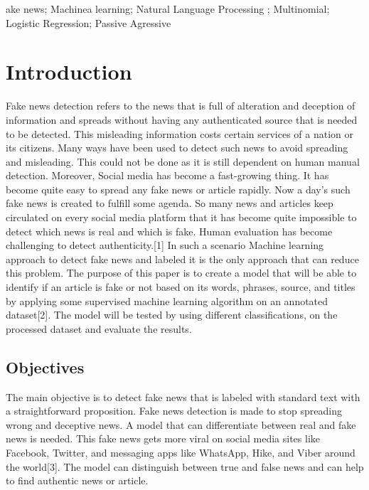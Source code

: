 \documentclass[conference]{IEEEtran}
\begin{document}
\vspace{12pt}


\begin{IEEEkeywords}
ake news; Machinea learning; Natural Language Processing ; Multinomial; Logistic Regression; Passive Agressive
\end{IEEEkeywords}

\section{Introduction}
Fake news detection refers to the news that is full of alteration and deception of information and spreads without having any authenticated source that is needed to be detected. This misleading information costs certain services of a nation or its citizens. Many ways have been used to detect such news to avoid spreading and misleading. This could not be done as it is still dependent on human manual detection. Moreover, Social media has become a fast-growing thing. It has become quite easy to spread any fake news or article rapidly. Now a day’s such fake news is created to fulfill some agenda. So many news and articles keep circulated on every social media platform that it has become quite impossible to detect which news is real and which is fake. Human evaluation has become challenging to detect authenticity.[1] In such a scenario Machine learning approach to detect fake news and labeled it is the only approach that can reduce this problem.
The purpose of this paper is to create a model that will be able to identify if an article is fake or not based on its words, phrases, source, and titles by applying some supervised machine learning algorithm on an annotated dataset[2]. The model will be tested by using different classifications, on the processed dataset and evaluate the results.

\subsection{Objectives}
The main objective is to detect fake news that is labeled with standard text with a straightforward proposition. Fake news detection is made to stop spreading wrong and deceptive news. A model that can differentiate between real and fake news is needed. This fake news gets more viral on social media sites like Facebook, Twitter, and messaging apps like WhatsApp, Hike, and Viber around the world[3]. The model can distinguish between true and false news and can help to find authentic news or article.
\end{document}
